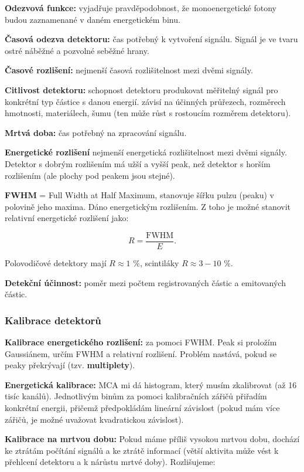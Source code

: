 \textbf{Odezvová funkce:} vyjadřuje pravděpodobnost, že monoenergetické fotony budou zaznamenané v daném energetickém binu.

\textbf{Časová odezva detektoru:} čas potřebný k vytvoření signálu. Signál je ve tvaru ostré náběžné a pozvolné seběžné hrany.

\textbf{Časové rozlišení:} nejmenší časová rozlišitelnost mezi dvěmi signály.

\textbf{Citlivost detektoru:} schopnost detektoru produkovat měřitelný signál pro konkrétní typ částice s danou energií. závisí na účinných průřezech, rozměrech hmotnosti, materiálech, šumu (ten může růst s rostoucím rozměrem detektoru).

\textbf{Mrtvá doba:} čas potřebný na zpracování signálu.

\textbf{Energetické rozlišení} nejmenší energetická rozlišitelnost mezi dvěmi signály. Detektor s dobrým rozlišením má užší a vyšší peak, než detektor s horším rozlišením (ale plochy pod peakem jsou stejné).

\textbf{FWHM} = Full Width at Half Maximum, stanovuje šířku pulzu (peaku) v polovině jeho maxima. Dáno energetickým rozlišením. Z toho je možné stanovit relativní energetické rozlišení jako:

$$ R = \dfrac{\text{FWHM}}{E}. $$

Polovodičové detektory mají $R \approx 1$ \%, scintiláky $R \approx 3-10$ \%.

\textbf{Detekční účinnost:} poměr mezi počtem registrovaných částic a emitovaných částic.

\subsubsection{Kalibrace detektorů}

\textbf{Kalibrace energetického rozlišení:} za pomoci FWHM. Peak si proložím Gaussiánem, určím FWHM a relativní rozlišení. Problém nastává, pokud se peaky překrývají (tzv. \textbf{multiplety}).

\textbf{Energetická kalibrace:} MCA mi dá histogram, který musím zkalibrovat (až 16 tisíc kanálů). Jednotlivým binům za pomoci kalibračních zářičů přiřadím konkrétní energii, přičemž předpokládám lineární závislost (pokud mám více zářičů, je možné uvažovat kvadratickou závislost).

\textbf{Kalibrace na mrtvou dobu:} Pokud máme příliš vysokou mrtvou dobu, dochází ke ztrátám počítání signálů a ke ztrátě informací (větší aktivita může vést k přehlcení detektoru a k nárůstu mrtvé doby). Rozlišujeme:

